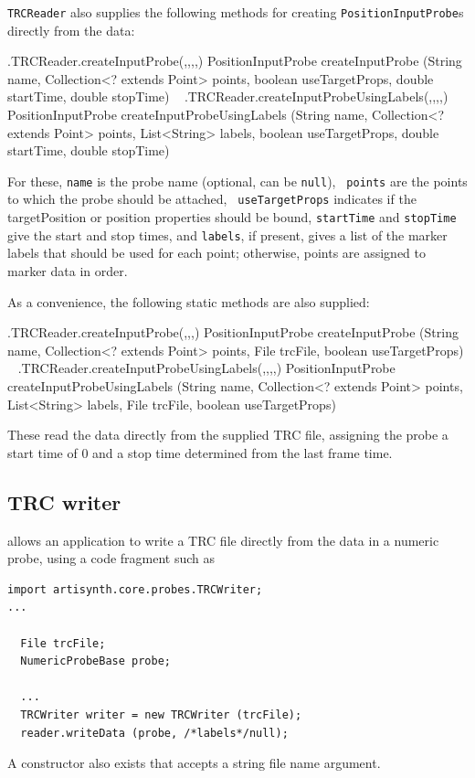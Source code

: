 {\tt TRCReader} also supplies the following methods for
creating {\tt PositionInputProbe}s directly from the data:
%
\begin{methodtable}{0.9}{0.1}
%
\methodentry
{\probes.TRCReader.createInputProbe(,,,,)}%
{PositionInputProbe createInputProbe (String name, 
Collection<? extends Point> points,\brh
boolean useTargetProps, double startTime, double stopTime)}%
{\ }%
\methodspace{0.5em}%
%
\methodentry
{\probes.TRCReader.createInputProbeUsingLabels(,,,,)}%
{PositionInputProbe createInputProbeUsingLabels (String name, 
Collection<? extends Point> points,\brh
List<String> labels, boolean useTargetProps, double startTime, double stopTime)}%
{\ }%
%
\end{methodtable}
%
For these, {\tt name} is the probe name (optional, can be {\tt null}), {\tt
points} are the points to which the probe should be attached, {\tt
useTargetProps} indicates if the {\sf targetPosition} or {\sf position}
properties should be bound, {\tt startTime} and {\tt stopTime} give the
start and stop times, and {\tt labels}, if present, gives a list of the marker
labels that should be used for each point; otherwise, points are assigned to
marker data in order.

As a convenience, the following static methods are also supplied:

\begin{methodtable}{0.9}{0.1}
%
\methodentry
{\probes.TRCReader.createInputProbe(,,,)}%
{PositionInputProbe createInputProbe (String name, 
Collection<? extends Point> points,\brh
File trcFile, boolean useTargetProps)}%
{\ }%
%
\methodspace{0.5em}%
%
\methodentry
{\probes.TRCReader.createInputProbeUsingLabels(,,,,)}%
{PositionInputProbe createInputProbeUsingLabels (String name, 
Collection<? extends Point> points,\brh
List<String> labels, File trcFile, boolean useTargetProps)}%
{\ }%
%
\end{methodtable}
%
These read the data directly from the supplied TRC file, assigning the probe a
start time of 0 and a stop time determined from the last frame time.

\subsection{TRC writer}
\label{TRCWriter:sec}

 allows an application to write a TRC file
directly from the data in a numeric probe, using a code fragment such as
%
\begin{lstlisting}[]
import artisynth.core.probes.TRCWriter;
...

  File trcFile;
  NumericProbeBase probe;

  ...
  TRCWriter writer = new TRCWriter (trcFile);
  reader.writeData (probe, /*labels*/null);
\end{lstlisting}
%
A constructor also exists that accepts a string file name argument.

